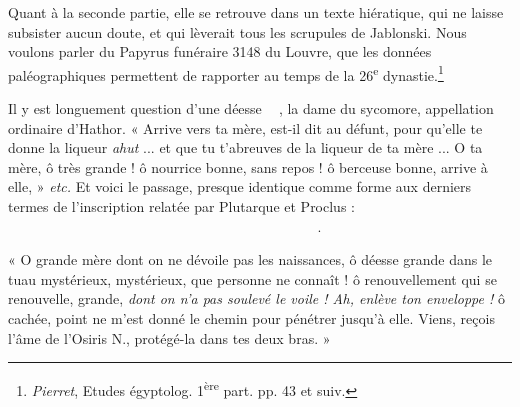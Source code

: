 \documentclass[letterpaper,twocolumn,openany,nodeprecatedcode]{dndbook}
\newcommand*\hieroAAAG{}
\newcommand*\hieroAAAH{}
\newcommand*\hieroAAAU{}
\newcommand*\hieroAABR{}
\newcommand*\hieroAACM{}
\newcommand*\hieroAACN{\raisebox{1ex}{}}
\newcommand*\hieroAACS{}
\newcommand*\hieroAACY{}
\newcommand*\hieroAADF{}
\newcommand*\hieroAADG{}
\newcommand*\hieroAADI{\raisebox{0.5ex}{}}
\newcommand*\hieroAADW{}
\newcommand*\hieroAAEB{}
\newcommand*\hieroAAEK{}
\newcommand*\hieroAAEN{}
\newcommand*\hieroAAEZ{}
\newcommand*\hieroAAFF{}
\newcommand*\hieroAAFS{}
\newcommand*\hieroAAFZ{\raisebox{0.5ex}{}}
\newcommand*\hieroAAHX{}
\newcommand*\hieroAAHY{}
\newcommand*\hieroAAHZ{}
\newcommand*\hieroAAII{}
\newcommand*\hieroAAIU{}
\newcommand*\hieroAAJZ{}
\newcommand*\hieroAAKO{}
\newcommand*\hieroAALM{}
\newcommand*\hieroAANC{}
\newcommand*\hieroAAND{\raisebox{0.5ex}{}}
\newcommand*\hieroAANR{}
\newcommand*\hieroAANT{\raisebox{0.5ex}{}}
\newcommand*\hieroAAOX{}
\newcommand*\hieroAARO{}
\newcommand*\hieroAATE{}
\newcommand*\hieroAAZP{}
\newcommand*\hieroAAZU{}
\newcommand*\hieroABHT{}
\newcommand*\hieroABHU{}
\newcommand*\hieroABHV{}
\newcommand*\hieroABHW{}
\newcommand*\hieroABHX{}
\newcommand*\hieroABHY{}
\newcommand*\hieroABHZ{}
\newcommand*\hieroABIA{}
\newcommand*\hieroABIB{}
\newcommand*\hieroABIC{}
\newcommand*\hieroABID{}
\newcommand*\hieroABIE{}
\newcommand*\hieroABIF{}
\newcommand*\hieroABIG{}
\newcommand*\hieroABIH{}
\newcommand*\hieroABII{}
\newcommand*\hieroABIJ{}
\newcommand*\hieroABIK{\raisebox{0.3ex}{}}
\newcommand*\hieroABIL{}
\newcommand*\hieroABIM{}
\newcommand*\hieroABIN{\raisebox{0.5ex}{}}
\newcommand*\hieroABIO{}
\newcommand*\hieroABIP{}
\begin{document}
Quant à la seconde partie, elle se retrouve dans un texte hiératique, qui ne laisse subsister aucun doute, et qui lèverait tous les scrupules de Jablonski. Nous voulons parler du Papyrus funéraire 3148 du Louvre, que les données paléographiques permettent de rapporter au temps de la 26\textsuperscript{e} dynastie.\footnote{\emph{Pierret}, Etudes égyptolog. 1\textsuperscript{ère} part. pp. 43 et suiv.}

Il y est longuement question d'une déesse $\hieroAAFS\:\hieroABHT\:\hieroAAAH\allowbreak\:\hieroAAAH\:\hieroAAAU$, la dame du sycomore, appellation ordinaire d'Hathor. « Arrive vers ta mère, est-il dit au défunt, pour qu'elle te donne la liqueur \emph{ahut} ... et que tu t'abreuves de la liqueur de ta mère ... O ta mère, ô très grande ! ô nourrice bonne, sans repos ! ô berceuse bonne, arrive à elle, » \emph{etc.} Et voici le passage, presque identique comme forme aux derniers termes de l'inscription relatée par Plutarque et Proclus : $\hieroAAAH\:\hieroAADF\:\hieroAAKO\allowbreak\:\hieroAAII\:\hieroAACY\:\hieroAANR\allowbreak\:\hieroAADW\:\hieroAACS\:\hieroABHU\allowbreak\:\hieroABHV\:\hieroAANC\:\hieroAACS\allowbreak\:\hieroABHW\:\hieroAACS\:\hieroAAAH\allowbreak\:\hieroAADF\:\hieroAAEK\:\hieroAAII\allowbreak\:\hieroABHX\:\hieroAABR\:\hieroAAIU\allowbreak\:\hieroAACN\:\hieroAANT\:\hieroAAAG\allowbreak\:\hieroAACM\:\hieroAAAU\:\hieroABHY\allowbreak\:\hieroABHZ\:\hieroAACY\:\hieroABIA\allowbreak\:\hieroABIB\:\hieroAAOX\:\hieroAARO\allowbreak\:\hieroAAJZ\:\hieroAACS\:\hieroAAAH\allowbreak\:\hieroAADF\:\hieroAAEK\:\hieroABIC\allowbreak\:\hieroAALM\:\hieroAATE\:\hieroAACY\allowbreak\:\hieroAAZP\:\hieroAADW\:\hieroAACS\allowbreak\:\hieroABHU\:\hieroABHV\:\hieroABID\allowbreak\:\hieroABIE\:\hieroAAAH\:\hieroAACS\allowbreak\:\hieroAAFZ\:\hieroAACS\:\hieroAAAH\allowbreak\:\hieroAADF\:\hieroAACS\:\hieroABHU\allowbreak\:\hieroABHV\:\hieroAAHX\:\hieroAAEZ\allowbreak\:\hieroAACM\:\hieroABIF\:\hieroAACS\allowbreak\:\hieroAAAH\:\hieroAADF\:\hieroAAZU\allowbreak\:\hieroAAAG\:\hieroAAHZ\:\hieroAAII\allowbreak\:\hieroAACY\:\hieroAADW\:\hieroABIG\allowbreak\:\hieroABID\:\hieroABIH\:\hieroAAEB\allowbreak\:\hieroAACN\:\hieroABII\:\hieroAAFF\allowbreak\:\hieroAADG\:\hieroAAEN\:\hieroABIJ\allowbreak\:\hieroABIK\:\hieroABIL\:\hieroABIM\allowbreak\:\hieroAACN\:\hieroAAHY\:\hieroAAND\allowbreak\:\hieroAAEK\:\hieroABIN\:\hieroAADI\allowbreak\:\hieroAACM\:\hieroAATE\:\hieroAACY\allowbreak\:\hieroAACS\:\hieroAABR\:\hieroAAIU\allowbreak\:\hieroAACN\:\hieroABIO\allowbreak\:\hieroABIP\:\hieroAACY$.

« O grande mère dont on ne dévoile pas les naissances, ô déesse grande dans le tuau mystérieux, mystérieux, que personne ne connaît ! ô renouvellement qui se renouvelle, grande, \emph{dont on n'a pas soulevé le voile ! Ah, enlève ton enveloppe !} ô cachée, point ne m'est donné le chemin pour pénétrer jusqu'à elle. Viens, reçois l'âme de l'Osiris N., protégé-la dans tes deux bras. »
\end{document}
